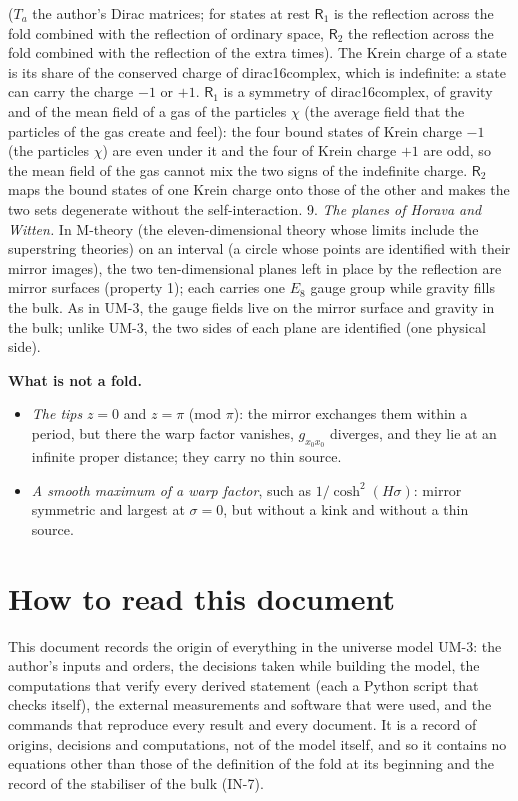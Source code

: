 \documentclass[
  10pt,
]{article}
\providecommand{\tightlist}{%
  \setlength{\itemsep}{0pt}\setlength{\parskip}{0pt}}
\begin{document}
(\(T_a\) the author's Dirac matrices; for states at rest
\(\mathsf{R}_1\) is the reflection across the fold combined with the
reflection of ordinary space, \(\mathsf{R}_2\) the reflection across the
fold combined with the reflection of the extra times). The Krein charge
of a state is its share of the conserved charge of dirac16complex, which
is indefinite: a state can carry the charge \(-1\) or \(+1\).
\(\mathsf{R}_1\) is a symmetry of dirac16complex, of gravity and of the
mean field of a gas of the particles \(\chi\) (the average field that
the particles of the gas create and feel): the four bound states of
Krein charge \(-1\) (the particles \(\chi\)) are even under it and the
four of Krein charge \(+1\) are odd, so the mean field of the gas cannot
mix the two signs of the indefinite charge. \(\mathsf{R}_2\) maps the
bound states of one Krein charge onto those of the other and makes the
two sets degenerate without the self-interaction. 9. \emph{The planes of
Horava and Witten.} In M-theory (the eleven-dimensional theory whose
limits include the superstring theories) on an interval (a circle whose
points are identified with their mirror images), the two ten-dimensional
planes left in place by the reflection are mirror surfaces (property 1);
each carries one \(E_8\) gauge group while gravity fills the bulk. As in
UM-3, the gauge fields live on the mirror surface and gravity in the
bulk; unlike UM-3, the two sides of each plane are identified (one
physical side).

\textbf{What is not a fold.}

\begin{itemize}
\tightlist
\item
  \emph{The tips} \(z = 0\) and \(z = \pi\) (mod \(\pi\)): the mirror
  exchanges them within a period, but there the warp factor vanishes,
  \(g_{x_0x_0}\) diverges, and they lie at an infinite proper distance;
  they carry no thin source.
\item
  \emph{A smooth maximum of a warp factor}, such as
  \(1/\cosh^2(H\sigma)\): mirror symmetric and largest at
  \(\sigma = 0\), but without a kink and without a thin source.
\end{itemize}

\hypertarget{how-to-read-this-document}{%
\section{How to read this document}\label{how-to-read-this-document}}

This document records the origin of everything in the universe model
UM-3: the author's inputs and orders, the decisions taken while building
the model, the computations that verify every derived statement (each a
Python script that checks itself), the external measurements and
software that were used, and the commands that reproduce every result
and every document. It is a record of origins, decisions and
computations, not of the model itself, and so it contains no equations
other than those of the definition of the fold at its beginning and the
record of the stabiliser of the bulk (IN-7).
\end{document}
